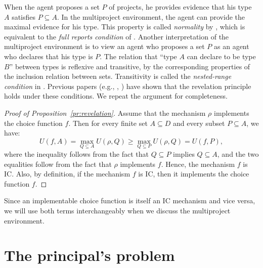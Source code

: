 \documentclass[12pt,english]{article}
\theoremstyle{remark}
\newenvironment{proofof}[1]{\begin{proof}[Proof of #1]}{\end{proof}}
\theoremstyle{plain}
\theoremstyle{definition}
\begin{document}
 When the agent proposes a set $P$ of projects, he provides evidence that his type $A$ satisfies $P\subseteq A$. In the multiproject environment, the agent can provide the maximal evidence for his type. This property is called \emph{normality} by \cite{BullWatson2007}, which is equivalent to the \emph{full reports condition} of \cite{LipmanSeppi1995}. Another interpretation of the multiproject environment is to view an agent who proposes a set $P$ as an agent who declares that his type is $P$. The relation that ``type $A$ can declare to be type $B$'' between types is reflexive and transitive, by the corresponding properties of the inclusion relation between sets. Transitivity is called the \emph{nested-range condition} in \cite{GreenLaffont1986}. Previous papers (e.g., \cite{GreenLaffont1986}, \cite{BullWatson2007}) have shown that the revelation principle holds under these conditions. We repeat the argument for completeness. %

\begin{proofof}{Proposition~\ref{pr:revelation}}
Assume that the mechanism $\rho$ implements the choice function $f$. Then for every finite set $A \subseteq D$ and every subset $P\subseteq A$, we have:
\[U(f,A)=\max_{Q \subseteq A} U(\rho,Q)\geqslant  \max_{Q \subseteq P} U(\rho,Q)=U(f,P),\]
where the inequality follows from the fact that $Q\subseteq P$ implies  $Q\subseteq A$, and the two equalities follow from the fact that $\rho$ implements $f$. Hence, the mechanism $f$ is IC. Also, by definition, if the mechanism $f$ is IC, then it implements the choice function $f$.
\end{proofof}

Since an implementable choice function is itself an IC mechanism and vice versa, we will use both terms interchangeably when we discuss the multiproject environment. 


\section{The principal's problem}
\end{document}
